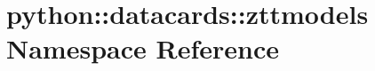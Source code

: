 \hypertarget{namespacepython_1_1datacards_1_1zttmodels}{
\section{python::datacards::zttmodels Namespace Reference}
\label{namespacepython_1_1datacards_1_1zttmodels}
}
